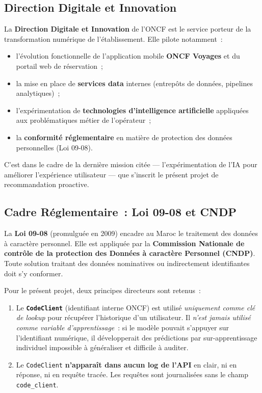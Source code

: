 \documentclass[11pt, a4paper]{article}
\begin{document}
\subsection{Direction Digitale et Innovation}

La \textbf{Direction Digitale et Innovation} de l'ONCF est le service
porteur de la transformation numérique de l'établissement. Elle pilote
notamment~:
\begin{itemize}
\item l'évolution fonctionnelle de l'application mobile \textbf{ONCF
    Voyages} et du portail web de réservation~;
\item la mise en place de \textbf{services data} internes
    (entrepôts de données, pipelines analytiques)~;
\item l'expérimentation de \textbf{technologies d'intelligence
    artificielle} appliquées aux problématiques métier de l'opérateur~;
\item la \textbf{conformité réglementaire} en matière de protection des
    données personnelles (Loi 09-08).
\end{itemize}

C'est dans le cadre de la dernière mission citée --- l'expérimentation
de l'IA pour améliorer l'expérience utilisateur --- que s'inscrit le
présent projet de recommandation proactive.

\subsection{Cadre Réglementaire~: Loi 09-08 et CNDP}

La \textbf{Loi 09-08} (promulguée en 2009) encadre au Maroc le
traitement des données à caractère personnel. Elle est appliquée par la
\textbf{Commission Nationale de contrôle de la protection des Données à
caractère Personnel (CNDP)}. Toute solution traitant des données
nominatives ou indirectement identifiantes doit s'y conformer.

Pour le présent projet, deux principes directeurs sont retenus~:
\begin{enumerate}
\item Le \textbf{\texttt{CodeClient}} (identifiant interne ONCF) est
    utilisé \textit{uniquement comme clé de lookup} pour récupérer
    l'historique d'un utilisateur. Il \textit{n'est jamais utilisé comme
    variable d'apprentissage}~: si le modèle pouvait s'appuyer sur
    l'identifiant numérique, il développerait des prédictions par
    sur-apprentissage individuel impossible à généraliser et difficile à
    auditer.
\item Le \texttt{CodeClient} \textbf{n'apparaît dans aucun log de l'API}
    en clair, ni en réponse, ni en requête tracée. Les requêtes sont
    journalisées sans le champ \texttt{code\_client}.
\end{enumerate}
\end{document}
